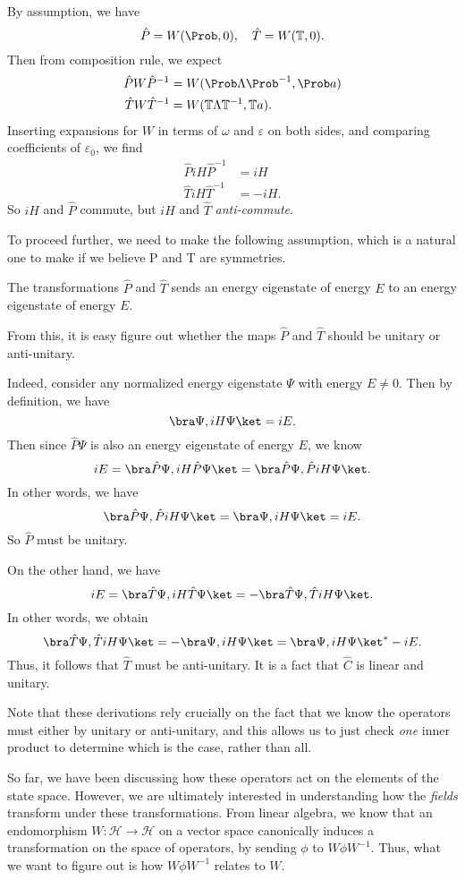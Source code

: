 \documentclass[a4paper]{article}
\begin{document}
By assumption, we have
\[
  \hat{P} = W(\Prob, 0),\quad \hat{T} = W(\mathbb{T}, 0).
\]
Then from composition rule, we expect
\begin{align*}
  \hat{P} W \hat{P}^{-1} &= W(\Prob \Lambda \Prob^{-1}, \Prob a)\\
  \hat{T} W \hat{T}^{-1} &= W(\mathbb{T} \Lambda \mathbb{T}^{-1}, \mathbb{T} a).
\end{align*}
Inserting expansions for $W$ in terms of $\omega$ and $\varepsilon$ on both sides, and comparing coefficients of $\varepsilon_0$, we find
\begin{align*}
  \hat{P} i H \hat{P}^{-1} &= iH\\
  \hat{T} iH \hat{T}^{-1} &= -iH.
\end{align*}
So $iH$ and $\hat{P}$ commute, but $iH$ and $\hat{T}$ \emph{anti-commute}.

To proceed further, we need to make the following assumption, which is a natural one to make if we believe P and T are symmetries.
\begin{assumption}
  The transformations $\hat{P}$ and $\hat{T}$ sends an energy eigenstate of energy $E$ to an energy eigenstate of energy $E$.
\end{assumption}
From this, it is easy figure out whether the maps $\hat{P}$ and $\hat{T}$ should be unitary or anti-unitary.

Indeed, consider any normalized energy eigenstate $\Psi$ with energy $E \not = 0$. Then by definition, we have
\[
  \bra \Psi, i H \Psi\ket = iE.
\]
Then since $\hat{P}\Psi$ is also an energy eigenstate of energy $E$, we know
\[
  iE = \bra \hat{P} \Psi, iH \hat{P} \Psi\ket = \bra \hat{P} \Psi, \hat{P} iH \Psi \ket.
\]
In other words, we have
\[
  \bra \hat{P} \Psi, \hat{P} iH \Psi \ket = \bra \Psi, iH \Psi \ket = iE.
\]
So $\hat{P}$ must be unitary.

On the other hand, we have
\[
  iE = \bra \hat{T} \Psi, iH \hat{T} \Psi\ket = -\bra \hat{T} \Psi, \hat{T} iH \Psi \ket.
\]
In other words, we obtain
\[
  \bra \hat{T} \Psi, \hat{T} iH \Psi \ket = -\bra \Psi, iH \Psi \ket = \bra \Psi, iH\Psi\ket^* -iE.
\]
Thus, it follows that $\hat{T}$ must be anti-unitary. It is a fact that $\hat{C}$ is linear and unitary.

Note that these derivations rely crucially on the fact that we know the operators must either by unitary or anti-unitary, and this allows us to just check \emph{one} inner product to determine which is the case, rather than all.

So far, we have been discussing how these operators act on the elements of the state space. However, we are ultimately interested in understanding how the \emph{fields} transform under these transformations. From linear algebra, we know that an endomorphism $W: \mathcal{H} \to \mathcal{H}$ on a vector space canonically induces a transformation on the space of operators, by sending $\phi$ to $W\phi W^{-1}$. Thus, what we want to figure out is how $W \phi W^{-1}$ relates to $W$.
\end{document}

